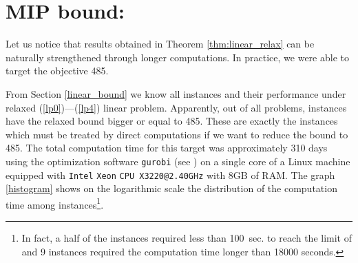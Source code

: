 \section{MIP bound: \therecord}

\label{mip_bound}



Let us notice that results obtained in Theorem \ref{thm:linear_relax} can be naturally strengthened through longer computations. In practice, we were able to target 
the objective 485. %


From Section \ref{linear_bound} we know all \theoctagons instances and their performance under relaxed (\ref{lp0})---(\ref{lp4}) linear problem. Apparently, out of all \theoctagons problems, \theinstances instances have the relaxed bound bigger or equal to 485. These are exactly the instances which must be treated by direct computations if we want to reduce the bound to 485. The total computation time for this target was approximately 310 days using the optimization software {\tt gurobi} (see \cite{gurobi}) on a single core of a Linux machine equipped with {\tt Intel\textsuperscript{\textregistered}} {\tt Xeon\textsuperscript{\textregistered}} {\tt CPU X3220@2.40GHz} with 8GB of RAM. The graph \ref{histogram} shows on the logarithmic scale the distribution of the computation time among \theinstances instances\footnote{In fact, a half of the instances required less than 100~sec. to reach the limit of \therecord and 9 instances required the computation time longer than 18000 seconds.}. 
